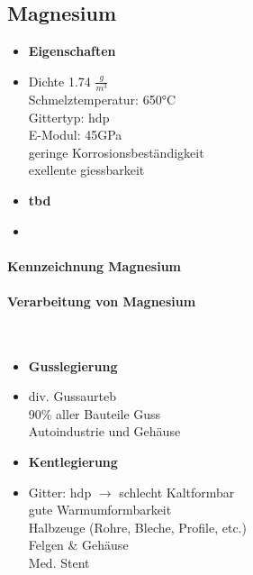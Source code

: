 \documentclass[12pt,twocolumn]{article}
\begin{document}
    \subsection{Magnesium}
    \begin{minipage}[t]{0.5\columnwidth}
        \begin{itemize}[label={}, leftmargin=*, itemsep=0.01em]
            \item \textbf{Eigenschaften}
            \item Dichte 1.74 $\frac{g}{m^3}$\\ Schmelztemperatur: 650°C \\ Gittertyp: hdp \\ E-Modul: 45GPa \\ geringe Korrosionsbeständigkeit \\ exellente giessbarkeit
        \end{itemize}
    \end{minipage}\hfill
    \begin{minipage}[t]{0.5\columnwidth}
        \begin{itemize}[label={}, leftmargin=*,  itemsep=0.01em]
            \item \textbf{tbd}
            \item
        \end{itemize} 
    \end{minipage}\hfill
    \paragraph{Kennzeichnung Magnesium}
    \paragraph{Verarbeitung von Magnesium}\mbox{}\\
    \begin{minipage}[t]{0.5\columnwidth}
        \begin{itemize}[label={}, leftmargin=*, itemsep=0.01em]
            \item \textbf{Gusslegierung}
            \item div. Gussaurteb \\ 90\% aller Bauteile Guss \\ Autoindustrie und Gehäuse
        \end{itemize}
    \end{minipage}\hfill
    \begin{minipage}[t]{0.5\columnwidth}
        \begin{itemize}[label={}, leftmargin=*,  itemsep=0.01em]
            \item \textbf{Kentlegierung}
            \item Gitter: hdp $\rightarrow$ schlecht Kaltformbar \\  gute Warmumformbarkeit \\ Halbzeuge (Rohre, Bleche, Profile, etc.) \\ Felgen \& Gehäuse \\ Med. Stent
        \end{itemize} 
    \end{minipage}\hfill
\end{document}
